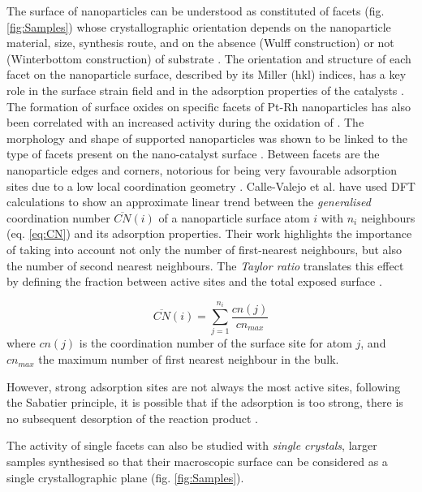 The surface of nanoparticles can be understood as constituted of facets (fig. \ref{fig:Samples}) whose crystallographic orientation depends on the nanoparticle material, size, synthesis route, and on the absence (Wulff construction) or not (Winterbottom construction) of substrate \parencite{Wulff1901, Winterbottom1967, Boukouvala2021}.
The orientation and structure of each facet on the nanoparticle surface, described by its Miller (hkl) indices, has a key role in the surface strain field and in the adsorption properties of the catalysts \parencite{Zhou2012, Wu2017, Altantzis2019, Wu2021}.
The formation of surface oxides on specific facets of Pt-Rh nanoparticles has also been correlated with an increased activity during the oxidation of  \parencite{Hejral2018}.
The morphology and shape of supported nanoparticles was shown to be linked to the type of facets present on the nano-catalyst surface \parencite{Ndolomingo2020}.
Between facets are the nanoparticle edges and corners, notorious for being very favourable adsorption sites due to a low local coordination geometry \parencite{Huang2008, Jiang2009}.
Calle-Valejo et al. \parencite*{CalleVallejo2014, CalleVallejo2015, CalleVallejo2018, CalleVallejo2023} have used DFT calculations to show an approximate linear trend between the \textit{generalised} coordination number $\overline{CN}(i)$ of a nanoparticle surface atom $i$ with $n_i$ neighbours (eq. \ref{eq:CN}) and its adsorption properties.
Their work highlights the importance of taking into account not only the number of first-nearest neighbours, but also the number of second nearest neighbours.
The \textit{Taylor ratio} translates this effect by defining the fraction between active sites and the total exposed surface \parencite{Taylor1925}.

\begin{equation}
    \overline{CN}(i) = \sum_{j=1}^{n_i} \frac{cn(j)}{cn_{max}}
    \label{eq:CN}
\end{equation}
where $cn(j)$ is the coordination number of the surface site for atom $j$, and $cn_{max}$ the maximum number of first nearest neighbour in the bulk.

However, strong adsorption sites are not always the most active sites, following the Sabatier principle, it is possible that if the adsorption is too strong, there is no subsequent desorption of the reaction product \parencite{Nilsson2005, Jiang2009}.

The activity of single facets can also be studied with \textit{single crystals}, larger samples synthesised so that their macroscopic surface can be considered as a single crystallographic plane (fig. \ref{fig:Samples}).

